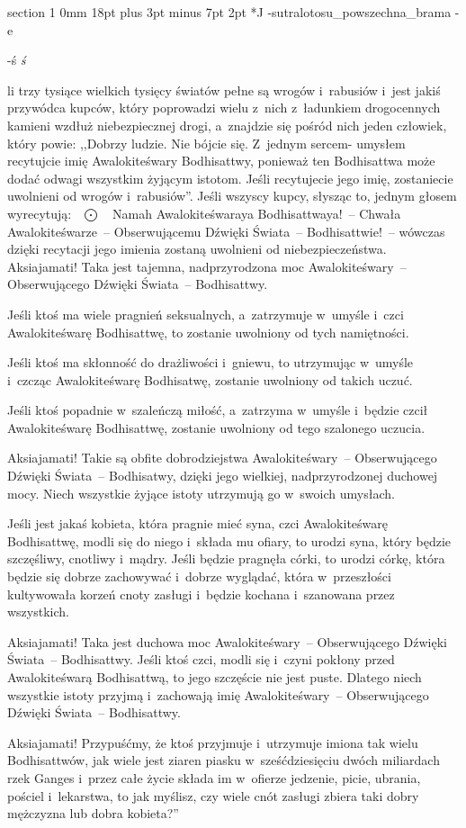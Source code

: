 \documentclass[12pt]{article}
\makeatletter
\renewcommand{\section}{\@startsection%
 {section}			%
 {1}				%
 {0mm}				%
 {18pt plus 3pt minus 7pt}	%
 { 2pt}				%
 {\bfseries}}			%
\newcommand{\keisu}		{\mbox{\ $\bigodot$\ \ }}
\newcounter{labelnum}
\newenvironment{Prayer}[4]{%
	\section*{#2}
	\ifx -#1
		\stepcounter{labelnum}\label{label.\arabic{labelnum}}\nopagebreak
	\else
		\label{#1}\nopagebreak
	\fi
	\ifx -#3
		\addcontentsline{toc}{section}{#2}
	\else
		\addcontentsline{toc}{section}{#3}
	\fi
	\ifx -#4
		{}
	\else
		\noindent\emph{#4}\par\nopagebreak
	\fi
	\begingroup
}
{\par\endgroup}
\makeatother
\begin{document}
\begin{Prayer}{sutralotosu_powszechna_brama}
Jeśli trzy tysiące wielkich tysięcy światów pełne są wrogów i~rabusiów i~jest
jakiś przywódca kupców, który poprowadzi wielu z~nich z~ładunkiem drogocennych
kamieni wzdłuż niebezpiecznej drogi, a~znajdzie się pośród nich jeden człowiek,
który powie: ,,Dobrzy ludzie. Nie bójcie się. Z~jednym sercem- umysłem
recytujcie imię Awalokiteśwary Bodhisattwy, ponieważ ten Bodhisattwa może dodać
odwagi wszystkim żyjącym istotom. Jeśli recytujecie jego imię, zostaniecie
uwolnieni od wrogów i~rabusiów''. Jeśli wszyscy kupcy, słysząc to, jednym głosem
wyrecytują: \keisu Namah Awalokiteśwaraya Bodhisattwaya!~-- Chwała Awalokiteśwarze~--
Obserwującemu Dźwięki Świata~-- Bodhisattwie!~-- wówczas dzięki recytacji jego
imienia zostaną uwolnieni od niebezpieczeństwa. Aksiajamati! Taka jest tajemna,
nadprzyrodzona moc Awalokiteśwary~-- Obserwującego Dźwięki Świata~--
Bodhisattwy.


Jeśli ktoś ma wiele pragnień seksualnych, a~zatrzymuje w~umyśle i~czci
Awalokiteśwarę Bodhisattwę, to zostanie uwolniony od tych namiętności.


Jeśli ktoś ma skłonność do drażliwości i~gniewu, to utrzymując w~umyśle
i~czcząc Awalokiteśwarę Bodhisatwę, zostanie uwolniony od takich uczuć.


Jeśli ktoś popadnie w~szaleńczą miłość, a~zatrzyma w~umyśle i~będzie czcił
Awalokiteśwarę Bodhisattwę, zostanie uwolniony od tego szalonego uczucia.


Aksiajamati! Takie są obfite dobrodziejstwa Awalokiteśwary~-- Obserwującego
Dźwięki Świata~-- Bodhisatwy, dzięki jego wielkiej, nadprzyrodzonej duchowej
mocy. Niech wszystkie żyjące istoty utrzymują go w~swoich umysłach.


Jeśli jest jakaś kobieta, która pragnie mieć syna, czci Awalokiteśwarę
Bodhisattwę, modli się do niego i~składa mu ofiary, to urodzi syna, który
będzie szczęśliwy, cnotliwy i~mądry. Jeśli będzie pragnęła córki, to urodzi
córkę, która będzie się dobrze zachowywać i~dobrze wyglądać, która
w~przeszłości kultywowała korzeń cnoty zasługi i~będzie kochana i~szanowana
przez wszystkich.


Aksiajamati! Taka jest duchowa moc Awalokiteśwary~-- Obserwującego Dźwięki
Świata~-- Bodhisattwy. Jeśli ktoś czci, modli się i~czyni pokłony przed
Awalokiteśwarą Bodhisattwą, to jego szczęście nie jest puste. Dlatego niech
wszystkie istoty przyjmą i~zachowają imię Awalokiteśwary~-- Obserwującego
Dźwięki Świata~-- Bodhisattwy.


Aksiajamati! Przypuśćmy, że ktoś przyjmuje i~utrzymuje imiona tak wielu
Bodhisattwów, jak wiele jest ziaren piasku w~sześćdziesięciu dwóch miliardach
rzek Ganges i~przez całe życie składa im w~ofierze jedzenie, picie, ubrania,
pościel i~lekarstwa, to jak myślisz, czy wiele cnót zasługi zbiera taki dobry
mężczyzna lub dobra kobieta?''



\end{Prayer}
\end{document}
